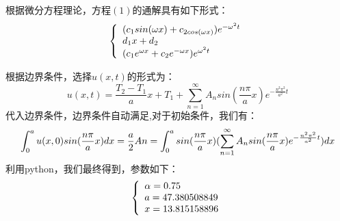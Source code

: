 \documentclass[bwprint]{cumcmthesis}
\begin{document}
    \indent 根据微分方程理论，方程$(1)$的通解具有如下形式：
    \begin{equation}
        \centering
        \left\{  
     \begin{array}{lr}  
        (c_{1}sin(\omega x)+c_{2cos(\omega x)})e^{-\omega^{2}t} \\   
        d_{1}x+d_{2} \\
        (c_{1}e^{\omega x}+c_{2}e^{-\omega x})e^{\omega^{2}t}
     \end{array}  
    \right.
    \end{equation}
    
    \indent 根据边界条件，选择$u(x,t)$的形式为：
    \begin{equation}
        u(x,t)=\frac{T_{2}-T_{1}}{a}x+T_{1}+\sum_{n=1}^{\infty}A_{n}sin(\frac{n\pi}{a}x)e^{-\frac{n^{2}\pi^{2}}{a^{2}}t}
    \end{equation}
    \indent  代入边界条件，边界条件自动满足,对于初始条件，我们有：
    \begin{equation}
        \centering
        \int_{0}^{a}u(x,0)sin(\frac{n\pi}{a}x)dx=\frac{a}{2}An=\int_{0}^{a}sin(\frac{n\pi}{a}x)(\sum_{n=1}^{\infty}A_{n}sin(\frac{n\pi}{a}x)e^{-\frac{n^{2}\pi^{2}}{a^{2}}t})dx
    \end{equation}
    \indent 利用python，我们最终得到，参数如下： 
    \begin{equation}
        \centering
        \left\{  
     \begin{array}{lr}  
        \alpha=0.75 \\   
        a=47.380508849 \\
        x=13.815158896
     \end{array}  
    \right.
    \end{equation}

    
    
     
\end{document}
